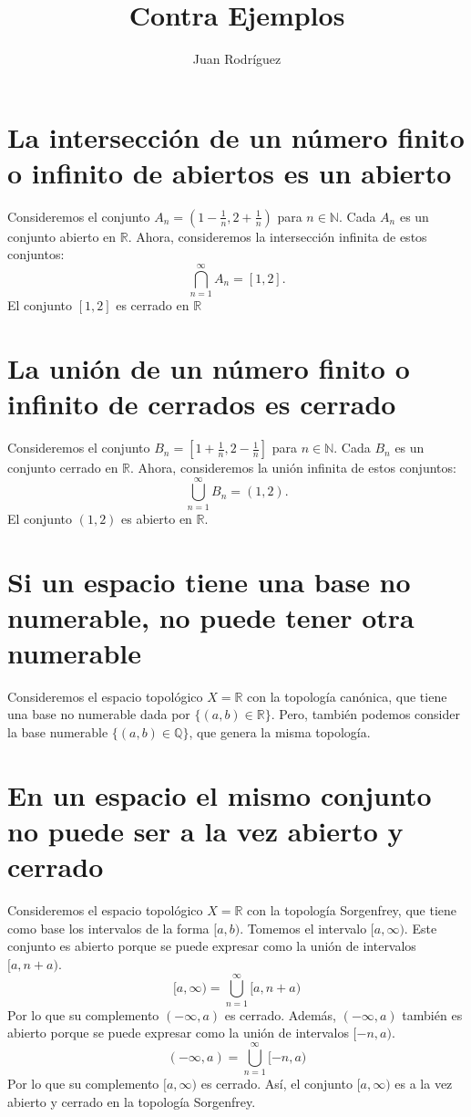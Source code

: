 \documentclass[12pt]{article}
\title{Contra Ejemplos}
\author{Juan Rodríguez}
\date{}
\begin{document}
\maketitle
\section*{La intersección de un número finito o infinito de abiertos es un abierto}
Consideremos el conjunto \( A_n = \left( 1 -\frac{1}{n}, 2 + \frac{1}{n} \right) \) para \( n \in \mathbb{N} \). Cada \( A_n \) es un conjunto abierto en \( \mathbb{R} \). Ahora, consideremos la intersección infinita de estos conjuntos:
\[ \bigcap_{n=1}^{\infty} A_n = [1,2]. \]
El conjunto \( [1,2] \) es cerrado en \( \mathbb{R} \)
\section*{La unión de un número finito o infinito de cerrados es cerrado}
Consideremos el conjunto \( B_n = \left[ 1 +\frac{1}{n}, 2 - \frac{1}{n} \right] \) para \( n \in \mathbb{N} \). Cada \( B_n \) es un conjunto cerrado en \( \mathbb{R} \). Ahora, consideremos la unión infinita de estos conjuntos:
\[ \bigcup_{n=1}^{\infty} B_n = (1,2). \]
El conjunto \( (1,2) \) es abierto en \( \mathbb{R} \).
\section*{Si un espacio tiene una base no numerable, no puede tener otra numerable}
Consideremos el espacio topológico \( X = \mathbb{R} \) con la topología canónica, que tiene una base no numerable dada por \(\{(a,b) \in \mathbb{R}\}\). Pero, también podemos consider la base numerable \(\{(a,b) \in \mathbb{Q}\}\), que genera la misma topología.
\section*{En un espacio el mismo conjunto no puede ser a la vez abierto y cerrado}
Consideremos el espacio topológico \( X = \mathbb{R} \) con la topología Sorgenfrey, que tiene como base los intervalos de la forma \([a,b)\).
Tomemos el intervalo \([a, \infty)\).
Este conjunto es abierto porque se puede expresar como la unión de intervalos \([a, n+a)\).
\[
[a, \infty) = \bigcup_{n=1}^{\infty} [a, n+a)
\]
Por lo que su complemento \((-\infty, a)\) es cerrado.
Además, \((-\infty, a)\) también es abierto porque se puede expresar como la unión de intervalos \([-n, a)\).
\[(-\infty, a) = \bigcup_{n=1}^{\infty} [-n, a)\]
Por lo que su complemento \([a, \infty)\) es cerrado.
Así, el conjunto \([a, \infty)\) es a la vez abierto y cerrado en la topología Sorgenfrey.
\end{document}
